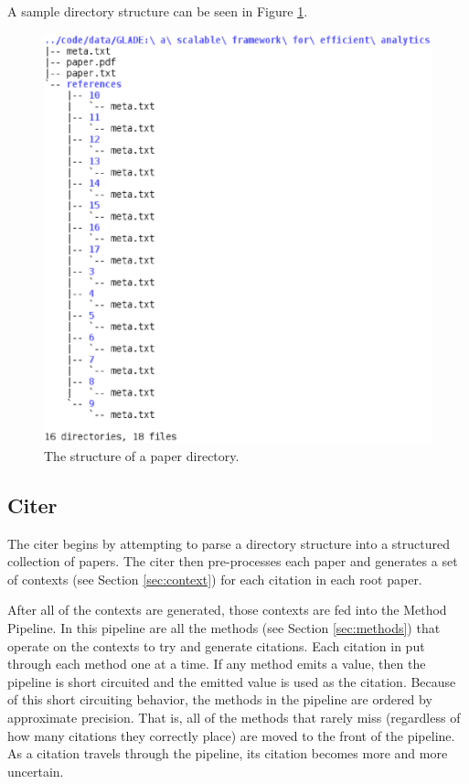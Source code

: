 \documentclass[10pt, conference, compsocconf]{IEEEtran}
\begin{document}

A sample directory structure can be seen in Figure \ref{fig:tree}.

\begin{figure}[ht]
   \includegraphics[width=\columnwidth]{images/tree.eps}
        \caption{The structure of a paper directory.}
        \label{fig:tree}
\end{figure}

\subsection{Citer}\label{sec:archCiter}
The citer begins by attempting to parse a directory structure into a structured collection of papers.
The citer then pre-processes each paper and generates a set of contexts (see Section \ref{sec:context}) for each citation in each
root paper.

After all of the contexts are generated, those contexts are fed into the Method Pipeline. In this pipeline are all the methods (see Section \ref{sec:methods})
that operate on the contexts to try and generate citations. Each citation in put through each method one at a time. If any method emits a value, then the pipeline
is short circuited and the emitted value is used as the citation. Because of this short circuiting behavior, the methods in the pipeline are ordered by approximate
precision. That is, all of the methods that rarely miss (regardless of how many citations they correctly place) are moved to the front of the pipeline.
As a citation travels through the pipeline, its citation becomes more and more uncertain.
\end{document}
